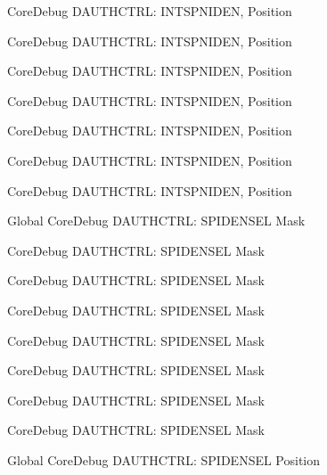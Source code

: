 \begin{DoxyRefList}
\label{deprecated__deprecated000139}%
%
Core\+Debug DAUTHCTRL\+: INTSPNIDEN, Position 

\label{deprecated__deprecated000638}%
%
Core\+Debug DAUTHCTRL\+: INTSPNIDEN, Position 

\label{deprecated__deprecated000433}%
%
Core\+Debug DAUTHCTRL\+: INTSPNIDEN, Position 

\label{deprecated__deprecated000536}%
%
Core\+Debug DAUTHCTRL\+: INTSPNIDEN, Position 

\label{deprecated__deprecated000278}%
%
Core\+Debug DAUTHCTRL\+: INTSPNIDEN, Position 

\label{deprecated__deprecated000085}%
%
Core\+Debug DAUTHCTRL\+: INTSPNIDEN, Position 

\label{deprecated__deprecated000215}%
%
Core\+Debug DAUTHCTRL\+: INTSPNIDEN, Position  
\item[Global \doxylink{group___c_m_s_i_s___s_c_b_gaa043fd13768d57be320c682ca1c9b234}{Core\+Debug\+\_\+\+DAUTHCTRL\+\_\+\+SPIDENSEL\+\_\+\+Msk} ]\label{deprecated__deprecated000092}%
%
Core\+Debug DAUTHCTRL\+: SPIDENSEL Mask 

\label{deprecated__deprecated000146}%
%
Core\+Debug DAUTHCTRL\+: SPIDENSEL Mask 

\label{deprecated__deprecated000285}%
%
Core\+Debug DAUTHCTRL\+: SPIDENSEL Mask 

\label{deprecated__deprecated000645}%
%
Core\+Debug DAUTHCTRL\+: SPIDENSEL Mask 

\label{deprecated__deprecated000222}%
%
Core\+Debug DAUTHCTRL\+: SPIDENSEL Mask 

\label{deprecated__deprecated000364}%
%
Core\+Debug DAUTHCTRL\+: SPIDENSEL Mask 

\label{deprecated__deprecated000543}%
%
Core\+Debug DAUTHCTRL\+: SPIDENSEL Mask 

\label{deprecated__deprecated000440}%
%
Core\+Debug DAUTHCTRL\+: SPIDENSEL Mask  
\item[Global \doxylink{group___c_m_s_i_s___s_c_b_ga587610b7ac18292de47bf9d675b0b88c}{Core\+Debug\+\_\+\+DAUTHCTRL\+\_\+\+SPIDENSEL\+\_\+\+Pos} ]\label{deprecated__deprecated000145}%
%
Core\+Debug DAUTHCTRL\+: SPIDENSEL Position 


\end{DoxyRefList}
